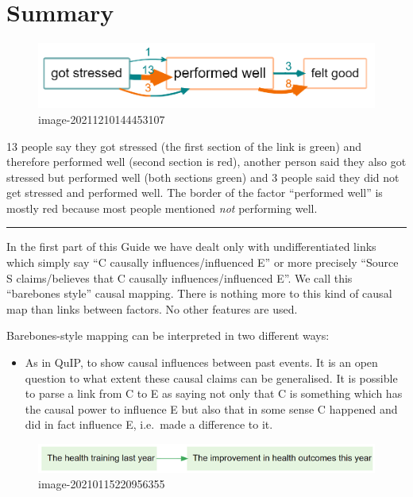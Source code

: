 \documentclass[
]{book}
\providecommand{\tightlist}{%
  \setlength{\itemsep}{0pt}\setlength{\parskip}{0pt}}
\begin{document}
\hypertarget{summary-2}{%
\section{Summary}\label{summary-2}}

\begin{figure}
\centering
\includegraphics{_assets/image-20211210144453107.png}
\caption{image-20211210144453107}
\end{figure}

13 people say they got stressed (the first section of the link is green) and therefore performed well (second section is red), another person said they also got stressed but performed well (both sections green) and 3 people said they did not get stressed and performed well. The border of the factor ``performed well'' is mostly red because most people mentioned \emph{not} performing well.

\begin{center}\rule{0.5\linewidth}{0.5pt}\end{center}

In the first part of this Guide we have dealt only with undifferentiated links which simply say ``C causally influences/influenced E'' or more precisely ``Source S claims/believes that C causally influences/influenced E''. We call this ``barebones style'' causal mapping. There is nothing more to this kind of causal map than links between factors. No other features are used.

Barebones-style mapping can be interpreted in two different ways:

\begin{itemize}
\tightlist
\item
  As in QuIP, to show causal influences between past events. It is an open question to what extent these causal claims can be generalised. It is possible to parse a link from C to E as saying not only that C is something which has the causal power to influence E but also that in some sense C happened and did in fact influence E, i.e.~made a difference to it.
\end{itemize}

\begin{figure}
\centering
\includegraphics{_assets/image-20210115220956355.png}
\caption{image-20210115220956355}
\end{figure}
\end{document}
